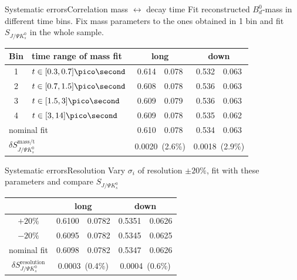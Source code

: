 \documentclass{beamer}
\newcommand{\Bd}{$B_d^0$}
\newcommand{\SJPsi}{S_{J/\Psi K_s^0}}
\begin{document}
\begin{frame}{Systematic errors}{Correlation mass $\leftrightarrow$ decay time}
Fit reconstructed \Bd-mass in different time bins. Fix mass parameters to the ones obtained in 1 bin and fit $\SJPsi$ in the whole sample.
\begin{center}
\begin{tabular}{c l r@{$\pm$}l r@{$\pm$}l}
\hline \hline
Bin & time range of mass fit & \multicolumn{2}{c}{long} & \multicolumn{2}{c}{down} \\ \hline
1 & $t \in [0.3, 0.7] \pico\second$ & 0.614 & 0.078 & 0.532 & 0.063 \\
2 & $t \in [0.7, 1.5] \pico\second$ & 0.608 & 0.078 & 0.536 & 0.063 \\
3 & $t \in [1.5, 3] \pico\second$ & 0.609 & 0.079 & 0.536 & 0.063 \\
4 & $t \in [3, 14] \pico\second$ & 0.609 & 0.078 & 0.535 & 0.062 \\ \hline
\multicolumn{2}{l}{nominal fit}  & 0.610 & 0.078 & 0.534 & 0.063 \\ \hline
\multicolumn{2}{l}{$\delta\SJPsi^{\text{mass/t}}$} & \multicolumn{2}{c}{0.0020\ (2.6\%)} & \multicolumn{2}{c}{0.0018\ (2.9\%)} \\

\hline \hline
\end{tabular}
\end{center}
\end{frame}

\begin{frame}{Systematic errors}{Resolution}
Vary $\sigma_i$ of resolution $\pm 20\%$, fit with these parameters and compare $\SJPsi$
\begin{center}
\begin{tabular}{c r@{$\pm$}l r@{$\pm$}l}
\hline \hline
 & \multicolumn{2}{c}{long} & \multicolumn{2}{c}{down} \\ \hline
$+20\%$ &0.6100 & 0.0782& 0.5351 & 0.0626 \\
$-20\%$ & 0.6095 & 0.0782 & 0.5345 & 0.0625 \\ \hline
nominal fit & 0.6098 & 0.0782 & 0.5347 & 0.0626 \\ \hline
$\delta\SJPsi^{\text{resolution}}$ & \multicolumn{2}{c}{0.0003\ (0.4\%)} & \multicolumn{2}{c}{0.0004\ (0.6\%)} \\
\hline \hline
\end{tabular}
\end{center}
\end{frame}
\end{document}
